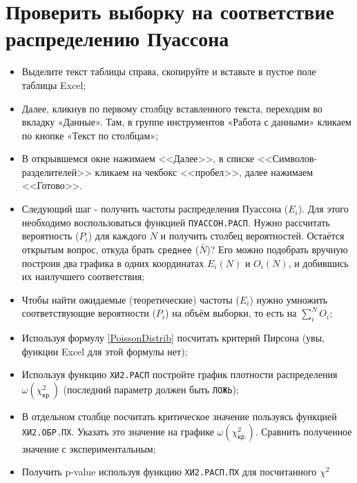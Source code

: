 \documentclass[14pt,a4paper]{article}
\begin{document}

\progress{}

\noindent\begin{minipage}{.85\textwidth}
\section{Проверить выборку на соответствие распределению Пуассона}
\noindent\begin{itemize}
	\item Выделите текст таблицы справа, скопируйте и вставьте в пустое поле таблицы Excel;
	\item Далее, кликнув по первому столбцу вставленного текста, переходим во вкладку «Данные». Там, в группе инструментов «Работа с данными» кликаем по кнопке «Текст по столбцам»; 
	\item В открывшемся окне нажимаем <<Далее>>, в списке <<Символов-разделителей>> кликаем на чекбокс <<пробел>>, далее нажимаем <<Готово>>.
	\item Следующий шаг - получить частоты распределения  Пуассона ($E_i$). Для этого необходимо воспользоваться функцией \texttt{ПУАССОН.РАСП}. Нужно рассчитать вероятность ($P_i$) для каждого $N$ и получить столбец вероятностей. Остаётся открытым вопрос, откуда брать \verb=среднее= ($\bar{N}$)? Его можно подобрать вручную построив два графика в одних координатах  $E_i(N)$ и $O_i(N)$, и добившись их наилучшего соответствия;
\end{itemize}
\end{minipage}
\begin{minipage}{.1\textwidth}
\end{minipage}
\begin{itemize}
	\item Чтобы найти ожидаемые (теоретические) частоты ($E_i$) нужно умножить соответствующие вероятности ($P_i$) на объём выборки, то есть на $\sum\limits_i^N O_i$;
	\item Используя формулу \ref{PoissonDistrib} посчитать критерий Пирсона (увы, функции Excel для этой формулы нет);
	\item Используя функцию \texttt{ХИ2.РАСП} постройте график плотности распределения $\omega(\chi_\text{кр.}^2)$ (последний параметр должен быть \verb=ЛОЖЬ=);
	\item В отдельном столбце посчитать критическое значение пользуясь функцией \texttt{ХИ2.ОБР.ПХ}. Указать это значение на графике $\omega(\chi_\text{кр.}^2)$. Сравнить полученное значение с экспериментальным;
	\item Получить p-value используя функцию \texttt{ХИ2.РАСП.ПХ} для посчитанного $\chi^2$
\end{itemize}
\end{document}
